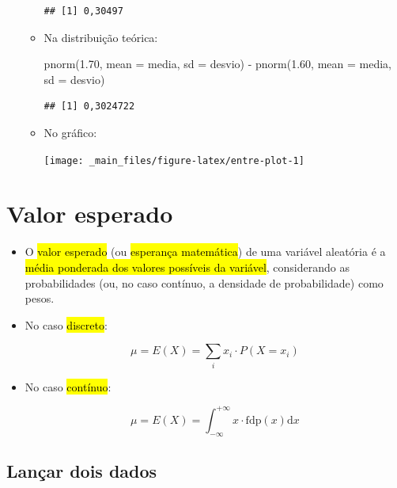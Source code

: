 \documentclass[
  11pt]{report}
\newenvironment{Shaded}{\begin{snugshade}}{\end{snugshade}}
\newcommand{\AttributeTok}[1]{\textcolor[rgb]{0.77,0.63,0.00}{#1}}
\newcommand{\FloatTok}[1]{\textcolor[rgb]{0.00,0.00,0.81}{#1}}
\newcommand{\FunctionTok}[1]{\textcolor[rgb]{0.00,0.00,0.00}{#1}}
\newcommand{\NormalTok}[1]{#1}
\newcommand{\SpecialCharTok}[1]{\textcolor[rgb]{0.00,0.00,0.00}{#1}}
\renewenvironment{Shaded}{
    \begin{mdframed}[%
      roundcorner=2pt,%
      innerleftmargin=5pt,%
      innerrightmargin=5pt,%
      topline=true,%
      leftline=true,%
      rightline=true,%
      bottomline=true,%
      linewidth=0.5pt,%
      linecolor=black!20,%
      backgroundcolor=black!2,%
      skipabove=2ex,%
      skipbelow=2.5ex%
    ]%
  }
  {
    \end{mdframed}
  }
\begin{document}
\begin{itemize}
\begin{itemize}
\begin{verbatim}
## [1] 0,30497
\end{verbatim}
  \item
    Na distribuição teórica:

\begin{Shaded}
\begin{Highlighting}[]
\FunctionTok{pnorm}\NormalTok{(}\FloatTok{1.70}\NormalTok{, }\AttributeTok{mean =}\NormalTok{ media, }\AttributeTok{sd =}\NormalTok{ desvio) }\SpecialCharTok{{-}}
\FunctionTok{pnorm}\NormalTok{(}\FloatTok{1.60}\NormalTok{, }\AttributeTok{mean =}\NormalTok{ media, }\AttributeTok{sd =}\NormalTok{ desvio)}
\end{Highlighting}
\end{Shaded}

\begin{verbatim}
## [1] 0,3024722
\end{verbatim}
  \item
    No gráfico:

    \begin{center}\texttt{[image: \_main\_files/figure-latex/entre-plot-1]} \end{center}
  \end{itemize}
\end{itemize}

\hypertarget{valor-esperado}{%
\section{Valor esperado}\label{valor-esperado}}

\begin{itemize}
\item
  O {\hl{valor esperado}} (ou {\hl{esperança matemática}}) de uma variável aleatória é a {\hl{média ponderada dos valores possíveis da variável}}, considerando as probabilidades (ou, no caso contínuo, a densidade de probabilidade) como pesos.
\item
  No caso {\hl{discreto}}:

  \[
  \mu = E(X) = \sum_i x_i \cdot P(X = x_i)
  \]
\item
  No caso {\hl{contínuo}}:

  \[
  \mu = E(X) = \int_{-\infty}^{+\infty} x \cdot \text{fdp}(x) \text{d}x
  \]
\end{itemize}

\hypertarget{lanuxe7ar-dois-dados-1}{%
\subsection{Lançar dois dados}\label{lanuxe7ar-dois-dados-1}}
\end{document}
